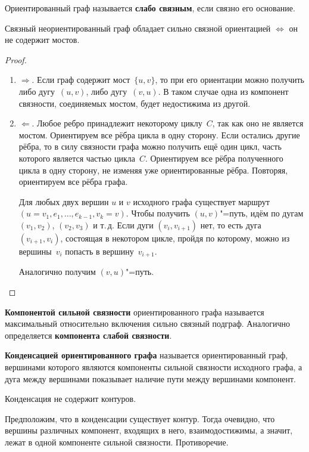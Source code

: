 Ориентированный граф называется \textbf{слабо связным}, если связно его основание.

\begin{theorem}[Роббинса]
Связный неориентированный граф обладает сильно связной ориентацией $\Leftrightarrow$ он не содержит мостов.
\end{theorem}
\begin{proof}
\begin{enumerate}
	\item $\Rightarrow$. Если граф содержит мост~$\{ u, v \}$, то при его ориентации можно получить либо дугу~$(u, v)$, либо дугу~$(v, u)$.
	В таком случае одна из компонент связности, соединяемых мостом, будет недостижима из другой.
	
	\item $\Leftarrow$. Любое ребро принадлежит некоторому циклу~$C$, так как оно не является мостом.
	Ориентируем все рёбра цикла в одну сторону.
	Если остались другие рёбра, то в силу связности графа можно получить ещё один цикл, часть которого является частью цикла~$C$.
	Ориентируем все рёбра полученного цикла в одну сторону, не изменяя уже ориентированные рёбра.
	Повторяя, ориентируем все рёбра графа.
	
	Для любых двух вершин $u$ и $v$ исходного графа существует маршрут $(u = v_1, e_1, \ldots, e_{k-1}, v_k = v)$.
	Чтобы получить $(u, v)$"=путь, идём по дугам $(v_1, v_2)$, $(v_2, v_3)$ и т.\,д.
	Если дуги $(v_i, v_{i+1})$ нет, то есть дуга $(v_{i+1}, v_i)$, состоящая в некотором цикле, пройдя по которому, можно из вершины~$v_i$ попасть в вершину~$v_{i+1}$.
	
	Аналогично получим $(v, u)$"=путь.
\end{enumerate}
\end{proof}

 \textbf{Компонентой сильной связности} ориентированного графа называется максимальный относительно включения сильно связный подграф.
Аналогично определяется \textbf{компонента слабой связности}.

\textbf{Конденсацией ориентированного графа} называется ориентированный граф, вершинами которого являются компоненты сильной связности исходного графа, а дуга между вершинами показывает наличие пути между вершинами компонент.

\begin{statement}
Конденсация не содержит контуров.
\end{statement}
\begin{proofcontra}
Предположим, что в конденсации существует контур.
Тогда очевидно, что вершины различных компонент, входящих в него, взаимодостижимы, а значит, лежат в одной компоненте сильной связности.
Противоречие.
\end{proofcontra}

